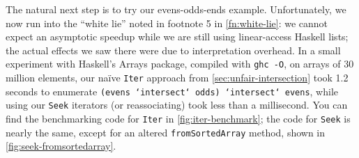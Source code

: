 \documentclass[acmsmall,screen,review,anonymous,dvipsnames,svgnames]{acmart}
\newcommand\hask[1]{\texttt{#1}}
\newcommand\ttt\texttt
\newcommand\todo[1]{{\color{Orange}#1}}
\renewcommand\todo[1]{{\color{IndianRed}#1}}
\renewcommand\todo[1]{\ignorespaces}
\begin{document}
\noindent
The natural next step is to try our evens-odds-ends example.
Unfortunately, we now run into the ``white lie'' noted in footnote 5 in \cref{fn:white-lie}:
we cannot expect an asymptotic speedup while we are still using linear-access Haskell lists; the actual effects we saw there were due to interpretation overhead.
In a small experiment with Haskell's Arrays package, compiled with \ttt{ghc -O}, on arrays of 30 million elements, our na\"ive \hask{Iter} approach from \cref{sec:unfair-intersection} took 1.2 seconds to enumerate \ttt{(evens `intersect` odds) `intersect` evens}, while using our \hask{Seek} iterators (or reassociating) took less than a millisecond.
You can find the benchmarking code for \hask{Iter} in \cref{fig:iter-benchmark}; the code for \hask{Seek} is nearly the same, except for an altered \ttt{fromSortedArray} method, shown in \cref{fig:seek-fromsortedarray}.






\end{document}
